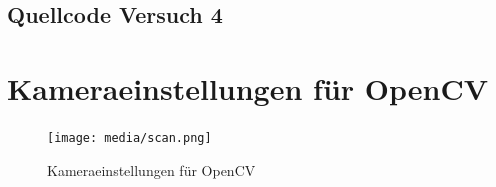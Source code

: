 \documentclass[12pt, oneside, a4paper, \docLanguage]{report}
\begin{document}
\subsection{Quellcode Versuch 4}
\label{chap:APPENDIX_SOURCECODE_V4}

\newpage

\newpage
\section{Kameraeinstellungen für OpenCV}
\label{chap:APPENDIX_MEASUREMENT_SOURCE}
\begin{figure}[hbt!]
	\centering\small
	\texttt{[image: media/scan.png]}
	\caption{Kameraeinstellungen für OpenCV}
	\label{fig:Kameraeinstellungen für OpenCV}
\end{figure}

%
%
\addtocounter{chapter}{1}
\setcounter{section}{1}


\end{document}
